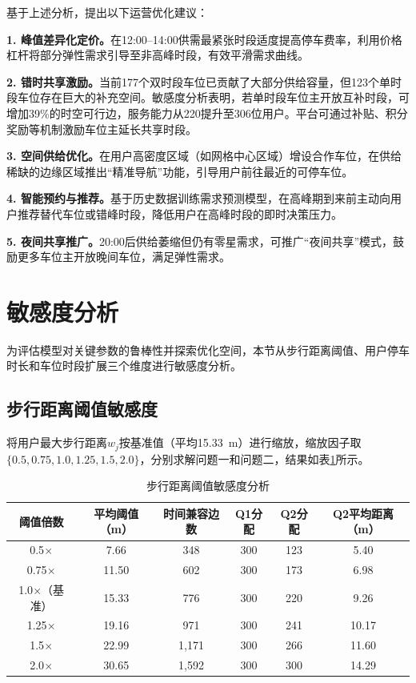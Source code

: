 \documentclass[12pt,a4paper]{ctexart}
\begin{document}
基于上述分析，提出以下运营优化建议：

\textbf{1. 峰值差异化定价。}在12:00--14:00供需最紧张时段适度提高停车费率，利用价格杠杆将部分弹性需求引导至非高峰时段，有效平滑需求曲线。

\textbf{2. 错时共享激励。}当前177个双时段车位已贡献了大部分供给容量，但123个单时段车位存在巨大的补充空间。敏感度分析表明，若单时段车位主开放互补时段，可增加39\%的时空可行边，服务能力从220提升至306位用户。平台可通过补贴、积分奖励等机制激励车位主延长共享时段\cite{xiao2020parking}。

\textbf{3. 空间供给优化。}在用户高密度区域（如网格中心区域）增设合作车位，在供给稀缺的边缘区域推出``精准导航''功能，引导用户前往最近的可停车位。

\textbf{4. 智能预约与推荐。}基于历史数据训练需求预测模型，在高峰期到来前主动向用户推荐替代车位或错峰时段，降低用户在高峰时段的即时决策压力。

\textbf{5. 夜间共享推广。}20:00后供给萎缩但仍有零星需求，可推广``夜间共享''模式，鼓励更多车位主开放晚间车位，满足弹性需求。


\section{敏感度分析}

为评估模型对关键参数的鲁棒性并探索优化空间，本节从步行距离阈值、用户停车时长和车位时段扩展三个维度进行敏感度分析。

\subsection{步行距离阈值敏感度}

将用户最大步行距离$w_j$按基准值（平均15.33~m）进行缩放，缩放因子取$\{0.5, 0.75, 1.0, 1.25, 1.5, 2.0\}$，分别求解问题一和问题二，结果如表\ref{tab:sens-walk}所示。

\begin{table}[H]
  \centering
  \caption{步行距离阈值敏感度分析}
  \label{tab:sens-walk}
  \begin{tabular}{cccccc}
    \toprule
    阈值倍数 & 平均阈值（m） & 时间兼容边数 & Q1分配 & Q2分配 & Q2平均距离（m） \\
    \midrule
    0.5$\times$ & 7.66 & 348 & 300 & 123 & 5.40 \\
    0.75$\times$ & 11.50 & 602 & 300 & 173 & 6.98 \\
    1.0$\times$（基准） & 15.33 & 776 & 300 & 220 & 9.26 \\
    1.25$\times$ & 19.16 & 971 & 300 & 241 & 10.17 \\
    1.5$\times$ & 22.99 & 1,171 & 300 & 266 & 11.60 \\
    2.0$\times$ & 30.65 & 1,592 & 300 & 300 & 14.29 \\
    \bottomrule
  \end{tabular}
\end{table}
\end{document}
